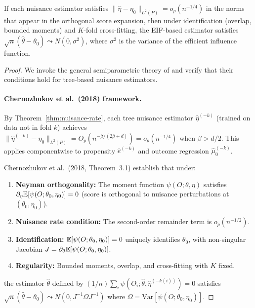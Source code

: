 \documentclass[12pt]{article}
\begin{document}
\begin{corollary}
\label{cor:dml}
If each nuisance estimator satisfies $\|\hat\eta - \eta_0\|_{L^2(P)} = o_p(n^{-1/4})$ in the norms that appear in the orthogonal score expansion, then under identification (overlap, bounded moments) and $K$-fold cross-fitting, the EIF-based estimator satisfies $\sqrt{n}(\hat\theta - \theta_0) \leadsto N(0, \sigma^2)$, where $\sigma^2$ is the variance of the efficient influence function.
\end{corollary}

\begin{proof}
We invoke the general semiparametric theory of \citet{chernozhukov2018} and verify that their conditions hold for tree-based nuisance estimators.

\paragraph{Chernozhukov et al.\ (2018) framework.}
By Theorem~\ref{thm:nuisance-rate}, each tree nuisance estimator $\hat\eta^{(-k)}$ (trained on data not in fold $k$) achieves $\|\hat\eta^{(-k)} - \eta_0\|_{L^2(P)} = O_p(n^{-\beta/(2\beta+d)}) = o_p(n^{-1/4})$ when $\beta > d/2$. This applies componentwise to propensity $\hat{e}^{(-k)}$ and outcome regression $\hat{\mu}_0^{(-k)}$.

Chernozhukov et al.\ (2018, Theorem~3.1) establish that under:
\begin{enumerate}[label=(\roman*)]
\item \textbf{Neyman orthogonality:} The moment function $\psi(O; \theta, \eta)$ satisfies $\partial_\eta \mathbb{E}[\psi(O; \theta_0, \eta_0)] = 0$ (score is orthogonal to nuisance perturbations at $(\theta_0, \eta_0)$).
\item \textbf{Nuisance rate condition:} The second-order remainder term is $o_p(n^{-1/2})$.
\item \textbf{Identification:} $\mathbb{E}[\psi(O; \theta_0, \eta_0)] = 0$ uniquely identifies $\theta_0$, with non-singular Jacobian $J = \partial_\theta \mathbb{E}[\psi(O; \theta_0, \eta_0)]$.
\item \textbf{Regularity:} Bounded moments, overlap, and cross-fitting with $K$ fixed.
\end{enumerate}
the estimator $\hat\theta$ defined by $(1/n)\sum_i \psi(O_i; \hat\theta, \hat\eta^{(-k(i))}) = 0$ satisfies $\sqrt{n}(\hat\theta - \theta_0) \leadsto N(0, J^{-1} \Omega J^{-1})$ where $\Omega = \text{Var}[\psi(O; \theta_0, \eta_0)]$.


\end{proof}
\end{document}
